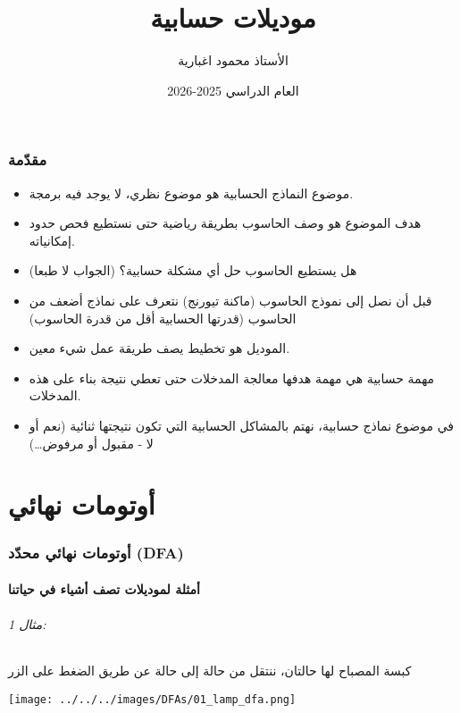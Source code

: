 \documentclass[12pt]{article}
\title{موديلات حسابية}
\author{الأستاذ محمود اغبارية}
\date{العام الدراسي 2025-2026}
\begin{document}
\maketitle

\renewcommand{\contentsname}{جدول المحتويات}
\tableofcontents
\clearpage

\section{مقدّمة}

\begin{itemize}
    \item موضوع النماذج الحسابية هو موضوع نظري، لا يوجد فيه برمجة.
    \item هدف الموضوع هو وصف الحاسوب بطريقة رياضية حتى نستطيع فحص حدود إمكانياته.
    \item هل يستطيع الحاسوب حل أي مشكلة حسابية؟ (الجواب لا طبعا)
    \item قبل أن نصل إلى نموذج الحاسوب (ماكنة تيورنج) نتعرف على نماذج أضعف من الحاسوب (قدرتها الحسابية أقل من قدرة الحاسوب)
    \item الموديل هو تخطيط يصف طريقة عمل شيء معين.
    \item مهمة حسابية هي مهمة هدفها معالجة المدخلات حتى تعطي نتيجة بناء على هذه المدخلات.
    \item في موضوع نماذج حسابية، نهتم بالمشاكل الحسابية التي تكون نتيجتها ثنائية (نعم أو لا - مقبول أو مرفوض\ldots)
\end{itemize}

\clearpage
\part{أوتومات نهائي}
\section{أوتومات نهائي محدّد (DFA)}

\subsection{أمثلة لموديلات تصف أشياء في حياتنا}

\paragraph{مثال 1:} كبسة المصباح لها حالتان، ننتقل من حالة إلى حالة عن طريق الضغط على الزر
\begin{center}
\texttt{[image: ../../../images/DFAs/01\_lamp\_dfa.png]}
\end{center}
\end{document}
